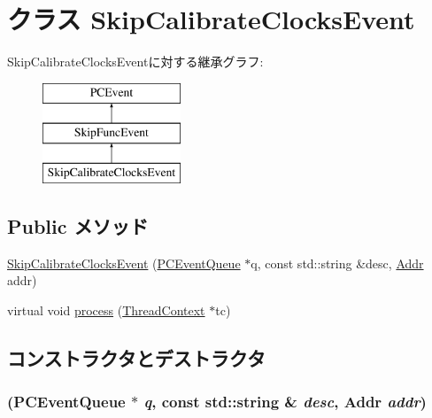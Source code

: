 \hypertarget{classFreebsdAlphaSystem_1_1SkipCalibrateClocksEvent}{
\section{クラス SkipCalibrateClocksEvent}
\label{classFreebsdAlphaSystem_1_1SkipCalibrateClocksEvent}
}
SkipCalibrateClocksEventに対する継承グラフ:\begin{figure}[H]
\begin{center}
\leavevmode
\includegraphics[height=3cm]{classFreebsdAlphaSystem_1_1SkipCalibrateClocksEvent}
\end{center}
\end{figure}
\subsection*{Public メソッド}
\begin{DoxyCompactItemize}
\item 
\hyperlink{classFreebsdAlphaSystem_1_1SkipCalibrateClocksEvent_afdfffb01a936dfd7a2fa6a009a382a72}{SkipCalibrateClocksEvent} (\hyperlink{classPCEventQueue}{PCEventQueue} $\ast$q, const std::string \&desc, \hyperlink{base_2types_8hh_af1bb03d6a4ee096394a6749f0a169232}{Addr} addr)
\item 
virtual void \hyperlink{classFreebsdAlphaSystem_1_1SkipCalibrateClocksEvent_ad66a9d5ec7cfe597b848a17c0df5cc28}{process} (\hyperlink{classThreadContext}{ThreadContext} $\ast$tc)
\end{DoxyCompactItemize}


\subsection{コンストラクタとデストラクタ}
\hypertarget{classFreebsdAlphaSystem_1_1SkipCalibrateClocksEvent_afdfffb01a936dfd7a2fa6a009a382a72}{
\subsubsection[{SkipCalibrateClocksEvent}]{ ({\bf PCEventQueue} $\ast$ {\em q}, \/  const std::string \& {\em desc}, \/  {\bf Addr} {\em addr})}}
\label{classFreebsdAlphaSystem_1_1SkipCalibrateClocksEvent_afdfffb01a936dfd7a2fa6a009a382a72}



